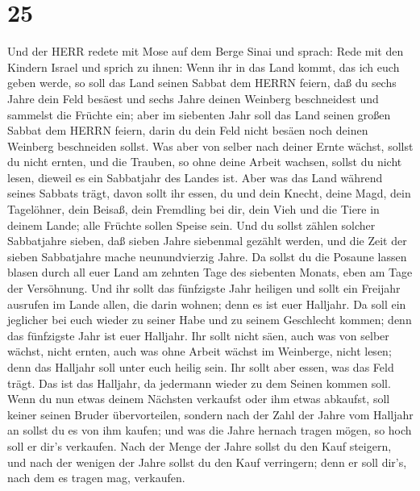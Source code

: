 \hypertarget{section-24}{%
\section{25}\label{section-24}}

 Und der HERR redete mit Mose auf dem Berge Sinai und
sprach:  Rede mit den Kindern Israel und sprich zu ihnen:
Wenn ihr in das Land kommt, das ich euch geben werde, so soll das Land
seinen Sabbat dem HERRN feiern,  daß du sechs Jahre dein
Feld besäest und sechs Jahre deinen Weinberg beschneidest und sammelst
die Früchte ein;  aber im siebenten Jahr soll das Land
seinen großen Sabbat dem HERRN feiern, darin du dein Feld nicht besäen
noch deinen Weinberg beschneiden sollst.  Was aber von
selber nach deiner Ernte wächst, sollst du nicht ernten, und die
Trauben, so ohne deine Arbeit wachsen, sollst du nicht lesen, dieweil es
ein Sabbatjahr des Landes ist.  Aber was das Land während
seines Sabbats trägt, davon sollt ihr essen, du und dein Knecht, deine
Magd, dein Tagelöhner, dein Beisaß, dein Fremdling bei dir, 
dein Vieh und die Tiere in deinem Lande; alle Früchte sollen Speise
sein.  Und du sollst zählen solcher Sabbatjahre sieben, daß
sieben Jahre siebenmal gezählt werden, und die Zeit der sieben
Sabbatjahre mache neunundvierzig Jahre.  Da sollst du die
Posaune lassen blasen durch all euer Land am zehnten Tage des siebenten
Monats, eben am Tage der Versöhnung.  Und ihr sollt das
fünfzigste Jahr heiligen und sollt ein Freijahr ausrufen im Lande allen,
die darin wohnen; denn es ist euer Halljahr. Da soll ein jeglicher bei
euch wieder zu seiner Habe und zu seinem Geschlecht kommen;
 denn das fünfzigste Jahr ist euer Halljahr. Ihr sollt
nicht säen, auch was von selber wächst, nicht ernten, auch was ohne
Arbeit wächst im Weinberge, nicht lesen;  denn das Halljahr
soll unter euch heilig sein. Ihr sollt aber essen, was das Feld trägt.
 Das ist das Halljahr, da jedermann wieder zu dem Seinen
kommen soll.  Wenn du nun etwas deinem Nächsten verkaufst
oder ihm etwas abkaufst, soll keiner seinen Bruder übervorteilen,
 sondern nach der Zahl der Jahre vom Halljahr an sollst du
es von ihm kaufen; und was die Jahre hernach tragen mögen, so hoch soll
er dir's verkaufen.  Nach der Menge der Jahre sollst du den
Kauf steigern, und nach der wenigen der Jahre sollst du den Kauf
verringern; denn er soll dir's, nach dem es tragen mag, verkaufen.
